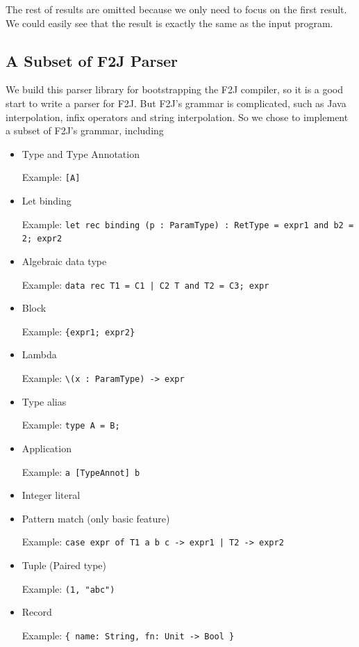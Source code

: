 The rest of results are omitted because we only need to focus on the first result. We could easily see that the result is exactly the same as the input program.

\subsection{A Subset of F2J Parser} \label{section:f2j_parser}

We build this parser library for bootstrapping the F2J compiler, so it is a good start to write a parser for F2J. But F2J's grammar is complicated, such as Java interpolation, infix operators and string interpolation. So we chose to implement a subset of F2J's grammar, including

\begin{itemize}
\item Type and Type Annotation

Example: \texttt{[A]}

\item Let binding

Example: \texttt{let rec binding (p : ParamType) : RetType = expr1 and b2 = 2; expr2}

\item Algebraic data type

Example: \texttt{data rec T1 = C1 | C2 T and T2 = C3; expr}

\item Block

Example: \texttt{\{expr1; expr2\}}

\item Lambda

Example: \texttt{\textbackslash (x : ParamType) -> expr}

\item Type alias

Example: \texttt{type A = B;}

\item Application

Example: \texttt{a [TypeAnnot] b}

\item Integer literal
\item Pattern match (only basic feature)

Example: \texttt{case expr of T1 a b c -> expr1 | T2 -> expr2}

\item Tuple (Paired type)

Example: \texttt{(1, "abc")}

\item Record

Example: \texttt{\{ name: String, fn: Unit -> Bool \}}

\end{itemize}

